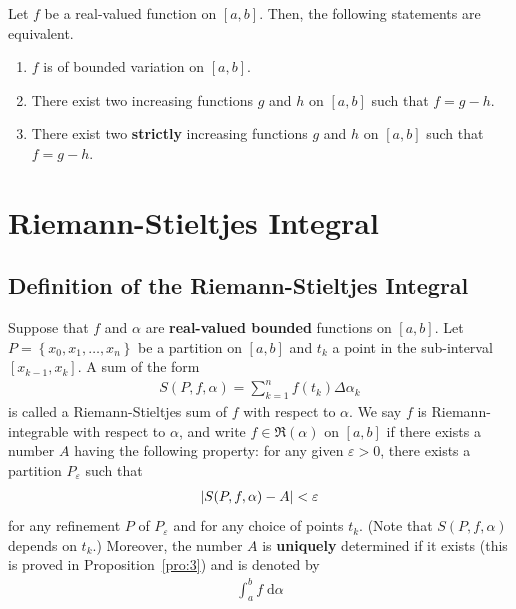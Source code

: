 \documentclass[thmcnt=section, 12pt]{my-elegantbook}
\begin{document}

\begin{theorem} \label{thm:22}
    Let $f$ be a real-valued function on $[a, b]$. Then, the following statements are equivalent.
    \begin{enumerate}
        \item $f$ is of bounded variation on $[a, b]$.
        \item There exist two increasing functions $g$ and $h$ on $[a, b]$ such that $f = g - h$.
        \item There exist two \textbf{strictly} increasing functions $g$ and $h$ on $[a, b]$ such that $f = g - h$.
    \end{enumerate}
\end{theorem}


\chapter{Riemann-Stieltjes Integral} \label{chap:1}

\section{Definition of the Riemann-Stieltjes Integral}


\begin{definition} \label{def:1}
    Suppose that $f$ and $\alpha$ are \textbf{real-valued bounded} functions on $[a,b]$. Let $P = \left\{x_0, x_1, \ldots, x_n\right\}$ be a partition on $[a, b]$ and $t_k$ a point in the sub-interval $[x_{k-1}, x_k]$. A sum of the form
    \begin{align*}
        S(P,f,\alpha)
        = \sum_{k=1}^n f(t_k) \Delta \alpha_k
    \end{align*}
    is called a Riemann-Stieltjes sum of $f$ with respect to $\alpha$. We say $f$ is Riemann-integrable with respect to $\alpha$, and write $f \in \mathfrak{R}(\alpha)$ on $[a,b]$ if there exists a number $A$ having the following property: for any given $\varepsilon > 0$, there exists a partition $P_\varepsilon$ such that
    \begin{align*}
        \left\lvert S(P,f,\alpha) - A \right\rvert < \varepsilon
    \end{align*}
    for any refinement $P$ of $P_\varepsilon$ and for any choice of points $t_k$. (Note that $S(P,f,\alpha)$ depends on $t_k$.) Moreover, the number $A$ is \textbf{uniquely} determined if it exists (this is proved in Proposition~\ref{pro:3}) and is denoted by \begin{align*}
        \int_a^b f \; \mathrm{d}\alpha
    \end{align*}
\end{definition}
\end{document}
